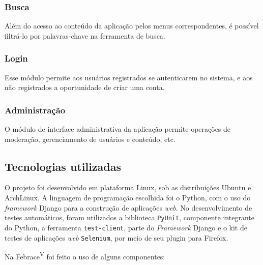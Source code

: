    \subsubsection{Busca}
      Além do acesso ao conteúdo da aplicação pelos menus correspondentes, é possível filtrá-lo por palavras-chave na ferramenta de busca.

    \subsubsection{Login}
      Esse módulo permite aos usuários registrados se autenticarem no sistema, e aos não registrados a oportunidade de criar uma conta.

    \subsubsection{Administração}
      O módulo de interface administrativa da aplicação permite operações de moderação, gerenciamento de usuários e conteúdo, etc.

  \subsection{Tecnologias utilizadas}\label{tecnologias}

O projeto foi desenvolvido em plataforma Linux, sob as distribuições Ubuntu e ArchLinux. A linguagem de programação escolhida foi o Python, com o uso do \textit{framework} Django para a construção de aplicações \textit{web}. No desenvolvimento de testes automáticos, foram utilizados a biblioteca \texttt{PyUnit}, componente integrante do Python, a ferramenta \texttt{test-client}, parte do \textit{Framework} Django e o kit de testes de aplicações \textit{web} \texttt{Selenium}, por meio de seu plugin para Firefox. 

Na Febrace\textsuperscript{V} foi feito o uso de alguns componentes:

